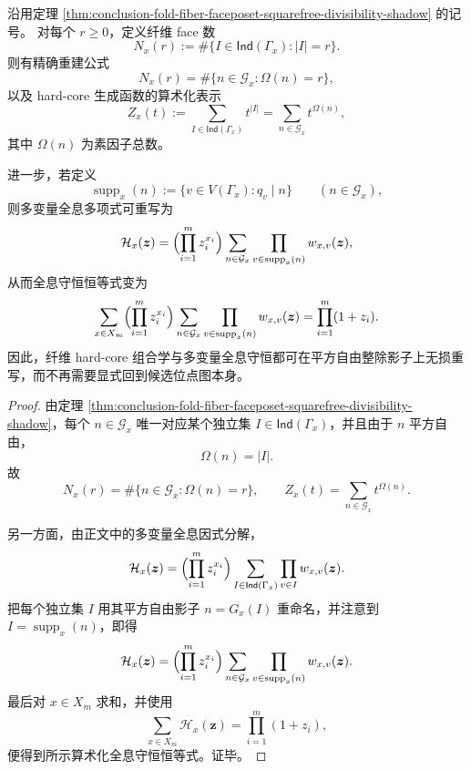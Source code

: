 \begin{theorem}\label{thm:conclusion-fold-fiber-squarefree-shadow-hardcore-holography}
沿用定理 \ref{thm:conclusion-fold-fiber-faceposet-squarefree-divisibility-shadow} 的记号。
对每个 \(r\ge 0\)，定义纤维 face 数
\[
N_x(r):=\#\{I\in\mathsf{Ind}(\Gamma_x):|I|=r\}.
\]
则有精确重建公式
\[
N_x(r)=\#\{n\in\mathcal G_x:\Omega(n)=r\},
\]
以及 hard-core 生成函数的算术化表示
\[
Z_x(t):=\sum_{I\in\mathsf{Ind}(\Gamma_x)}t^{|I|}
=
\sum_{n\in\mathcal G_x}t^{\Omega(n)},
\]
其中 \(\Omega(n)\) 为素因子总数。

进一步，若定义
\[
\operatorname{supp}_x(n):=\{v\in V(\Gamma_x):q_v\mid n\}
\qquad (n\in\mathcal G_x),
\]
则多变量全息多项式可重写为
\[
\mathcal H_x(\boldsymbol z)
=
\Bigl(\prod_{i=1}^{m}z_i^{x_i}\Bigr)
\sum_{n\in\mathcal G_x}\prod_{v\in\operatorname{supp}_x(n)}w_{x,v}(\boldsymbol z),
\]
从而全息守恒恒等式变为
\[
\sum_{x\in X_m}
\Bigl(\prod_{i=1}^{m}z_i^{x_i}\Bigr)
\sum_{n\in\mathcal G_x}\prod_{v\in\operatorname{supp}_x(n)}w_{x,v}(\boldsymbol z)
=
\prod_{i=1}^{m}(1+z_i).
\]
因此，纤维 hard-core 组合学与多变量全息守恒都可在平方自由整除影子上无损重写，而不再需要显式回到候选位点图本身。
\end{theorem}
\begin{proof}
由定理 \ref{thm:conclusion-fold-fiber-faceposet-squarefree-divisibility-shadow}，每个 \(n\in\mathcal G_x\) 唯一对应某个独立集 \(I\in\mathsf{Ind}(\Gamma_x)\)，并且由于 \(n\) 平方自由，
\[
\Omega(n)=|I|.
\]
故
\[
N_x(r)=\#\{n\in\mathcal G_x:\Omega(n)=r\},
\qquad
Z_x(t)=\sum_{n\in\mathcal G_x}t^{\Omega(n)}.
\]

另一方面，由正文中的多变量全息因式分解，
\[
\mathcal H_x(\boldsymbol z)
=
\Bigl(\prod_{i=1}^{m}z_i^{x_i}\Bigr)
\sum_{I\in\mathsf{Ind}(\Gamma_x)}\prod_{v\in I}w_{x,v}(\boldsymbol z).
\]
把每个独立集 \(I\) 用其平方自由影子 \(n=G_x(I)\) 重命名，并注意到 \(I=\operatorname{supp}_x(n)\)，即得
\[
\mathcal H_x(\boldsymbol z)
=
\Bigl(\prod_{i=1}^{m}z_i^{x_i}\Bigr)
\sum_{n\in\mathcal G_x}\prod_{v\in\operatorname{supp}_x(n)}w_{x,v}(\boldsymbol z).
\]
最后对 \(x\in X_m\) 求和，并使用
\[
\sum_{x\in X_m}\mathcal H_x(\boldsymbol z)=\prod_{i=1}^{m}(1+z_i),
\]
便得到所示算术化全息守恒恒等式。证毕。
\end{proof}
